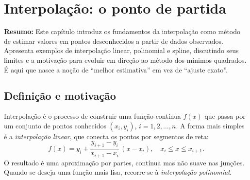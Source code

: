 \chapter{Interpolação: o ponto de partida}
\label{ch:interpolacao}

\noindent\textbf{Resumo:}
Este capítulo introduz os fundamentos da interpolação como método de estimar valores em pontos desconhecidos a partir de dados observados. Apresenta exemplos de interpolação linear, polinomial e spline, discutindo seus limites e a motivação para evoluir em direção ao método dos mínimos quadrados. É aqui que nasce a noção de ``melhor estimativa'' em vez de ``ajuste exato''.

\section{Definição e motivação}
Interpolação é o processo de construir uma função contínua $f(x)$ que passa por um conjunto de pontos conhecidos $(x_i, y_i)$, $i = 1,2,\dots,n$.  
A forma mais simples é a \emph{interpolação linear}, que conecta os pontos por segmentos de reta:
\begin{equation}
f(x) = y_i + \frac{y_{i+1}-y_i}{x_{i+1}-x_i}\,(x-x_i), \quad x_i \le x \le x_{i+1}.
\label{eq:interp-linear}
\end{equation}
O resultado é uma aproximação por partes, contínua mas não suave nas junções.  
Quando se deseja uma função mais lisa, recorre-se à \emph{interpolação polinomial}.

